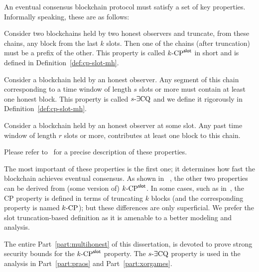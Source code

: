 An eventual consensus blockchain protocol 
must satisfy a set of key properties. Informally speaking, these are as follows:
\begin{description}[font=\normalfont\itshape\space]
  \item[Common Prefix Property (CP) with parameter $k$:]
  Consider two blockchains held by two honest observers and 
  truncate, from these chains, any block from the last $k$ slots. 
  Then one of the chains (after truncation) must be a prefix of the other. 
  This property is called ${k}\text{-}\mathrm{CP}^{\mathsf{slot}}$ in short and is defined in Definition~\ref{def:cp-slot-mh}. 

  \item[Chain Quality Property (CQ) with parameter $s$:]
  Consider a blockchain held by an honest observer. 
  Any segment of this chain 
  corresponding to a time window of length $s$ slots or more 
  must contain at least one honest block.
  This property is called ${s}\text{-}\exists\mathrm{CQ}$ 
  and we define it rigorously in Definition~\ref{def:cp-slot-mh}. 

  \item[Chain Growth Property (CG) with parameter $r$:]
  Consider a blockchain held by an honest observer at some slot. 
  Any past time window of length $r$ slots or more, 
  contributes at least one block to this chain.
\end{description}
Please refer to~\cite{GKL,Ouroboros,Praos,Genesis,SnowWhite} for a precise description of these properties.


The most important of these properties is the first one; 
it determines how fast the blockchain achieves eventual consensus. 
As shown in ~\cite{Ouroboros}, 
the other two properties can be derived from (some version of) ${k}\text{-}\mathrm{CP}^{\mathsf{slot}}$.
In some cases, such as in~\cite{GKL,Ouroboros,SnowWhite}, 
the CP property is defined in terms of truncating $k$ blocks 
(and the corresponding property is named ${k}\text{-}\mathrm{CP}$); 
but these differences are only superficial. 
We prefer the slot truncation-based definition 
as it is amenable to a better modeling and analysis.


The entire Part~\ref{part:multihonest} of this dissertation, 
is devoted to prove strong security bounds for the ${k}\text{-}\mathrm{CP}^{\mathsf{slot}}$ property. 
The ${s}\text{-}\exists\mathrm{CQ}$ property is used in the analysis in 
Part~\ref{part:praos} and Part~\ref{part:xorgames}.







